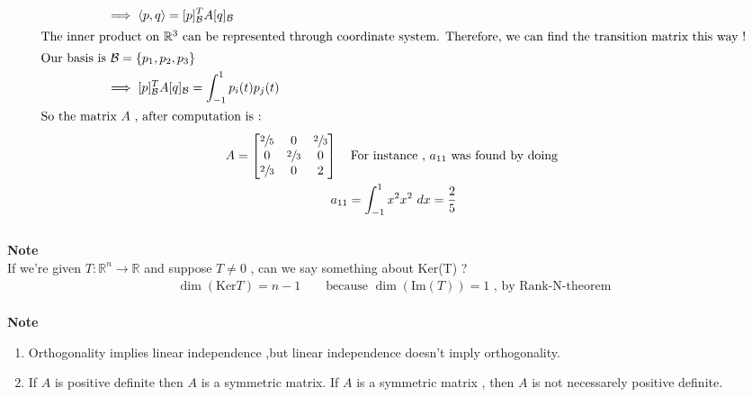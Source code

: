 \documentclass[
12pt,
]{article}
\newcommand{\la}{\langle}
\newcommand{\ra}{\rangle}
\theoremstyle{definition}
\theoremstyle{definition}
\theoremstyle{definition}
\theoremstyle{definition}
\begin{document}
\begin{align*}
		&\hspace{50pt}\implies  \la p,q \ra = [p]_{\mathcal{B}}^{T} A [q]_{\mathcal{B}}\\
		\intertext{The inner product on $\mathbb{R}^3$ can be represented through coordinate system. Therefore, we can find the transition matrix this way !}
		&\text{Our basis is} \ \mathcal{B} = \{p_1, p_2, p_3 \} \\
		&\hspace{50pt} \implies [p]_{\mathcal{B}}^{T} A [q]_{\mathcal{B}} = \int_{-1}^{1} p_i (t) p_j (t) \\
		\intertext{So the matrix $A$ , after computation is :} 
\end{align*}
\begin{gather*}
		A = 
		\begin{bmatrix}
			\sfrac{2}{5} & 0 & \sfrac{2}{3} \\
			0 & \sfrac{2}{3} & 0 \\
			\sfrac{2}{3} & 0 & 2
		\end{bmatrix} \quad 
		\text{For instance , $a_{11}$ was found by doing } \\
		a_{11} = \int_{-1}^{1} x^2 x^2 \ dx = \dfrac{2}{5}
\end{gather*}
\\
\textbf{Note }\\
If we're given $ T : \mathbb{R}^{n} \xrightarrow{} \mathbb{R} $ and suppose $T \neq 0 $ , can we say something about Ker(T) ?\\
\begin{gather*}
	\dim(\text{Ker}T) = n -1 \qquad \text{because $\dim(\text{Im}(T))=1$ , by Rank-N-theorem} 
\end{gather*} 
\\
\textbf{Note} \\
\begin{enumerate}
	\item Orthogonality implies linear independence ,but linear independence doesn't imply orthogonality. 
	\item If $A$ is positive definite then $A$ is a symmetric matrix. If $A$ is a symmetric matrix , then $A$ is not necessarely positive definite.
\end{enumerate}
\end{document}
